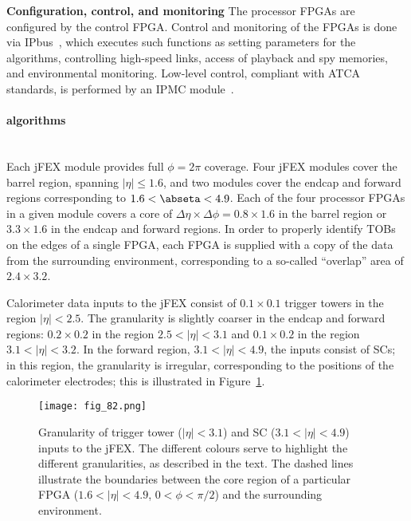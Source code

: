 \documentclass[cernpreprint, atlasdraft=false, UKenglish,british,orcidlogo, texmf, orcidlogo]{atlasdoc}
\begin{document}
\textbf{Configuration, control, and monitoring}
The processor \glspl{FPGA} are configured by the control \gls{FPGA}.  Control and monitoring of the \glspl{FPGA} is done via IPbus~\cite{bib:IPbus}, which executes such functions as setting parameters for the algorithms, controlling high-speed links, access of playback and spy memories, and environmental monitoring.  Low-level control, compliant with \gls{ATCA} standards, is performed by an \gls{IPMC} module~\cite{bib:CERN-IPMC}.
 
\paragraph{ algorithms}\mbox{}\\
Each \gls{jFEX} module provides full $\phi = 2\pi$ coverage.  Four \gls{jFEX} modules cover the barrel region, spanning $|\eta| \le 1.6$, and two modules cover the endcap and forward regions corresponding to $1.6 < \abseta < 4.9$.  Each of the four processor \glspl{FPGA} in a given module covers a core of $\Delta\eta\times\Delta\phi = 0.8 \times 1.6$ in the barrel region or $3.3 \times 1.6$ in the endcap and forward regions.  In order to properly identify \glspl{TOB} on the edges of a single \gls{FPGA}, each \gls{FPGA} is supplied with a copy of the data from the surrounding environment, corresponding to a so-called ``overlap'' area of $2.4 \times 3.2$.
 
Calorimeter data inputs to the \gls{jFEX} consist of $0.1 \times 0.1$ trigger towers in the region $|\eta| < 2.5$.  The granularity is slightly coarser in the endcap and forward regions: $0.2 \times 0.2$ in the region $2.5 < |\eta| < 3.1$ and $0.1 \times 0.2$ in the region $3.1 < |\eta| < 3.2$.  In the forward region, $3.1 < |\eta| < 4.9$, the inputs consist of \glspl{SC};  in this region, the granularity is irregular, corresponding to the positions of the calorimeter electrodes; this is illustrated in Figure~\ref{fig:TDAQL1CalojFEXGranularity}.
 
\begin{figure}[htbp]
\centerline{\texttt{[image: fig\_82.png]}}
\caption{Granularity of trigger tower ($|\eta| < 3.1$) and \gls{SC} ($3.1 < |\eta| < 4.9$) inputs to the \gls{jFEX}.  The different colours serve to highlight the different granularities, as described in the text.  The dashed lines illustrate the boundaries between the core region of a particular \gls{FPGA} ($1.6 < |\eta| < 4.9$, $0 < \phi < \pi/2$) and the surrounding environment.}
\label{fig:TDAQL1CalojFEXGranularity}
\end{figure}
 
\end{document}
